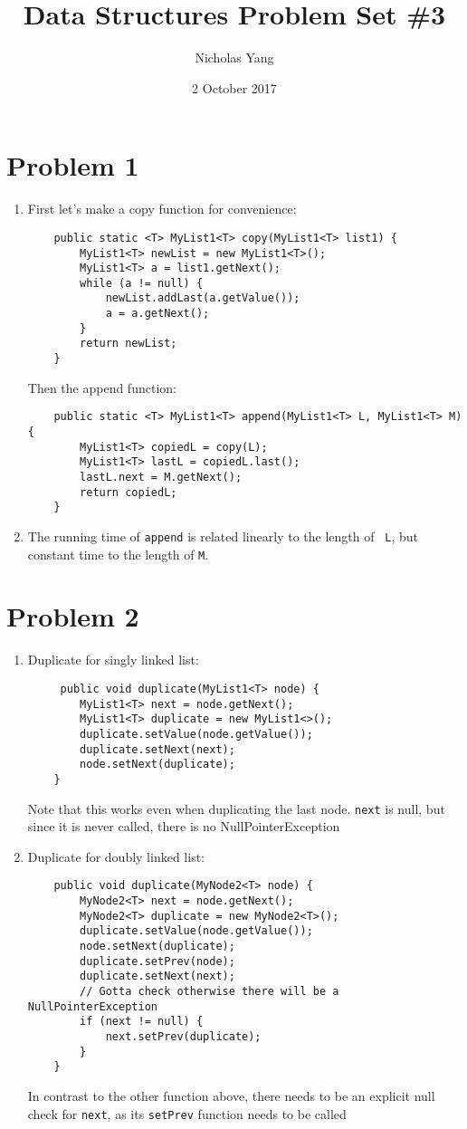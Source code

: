 \documentclass[12pt]{article}
\title{Data Structures Problem Set \#3}
\author{Nicholas Yang}
\date{2 October 2017}
\begin{document}
\maketitle
\section{Problem 1}
\begin{enumerate}[label=(\alph*)]
\item
  First let's make a copy function for convenience:
  \begin{verbatim}
    public static <T> MyList1<T> copy(MyList1<T> list1) {
        MyList1<T> newList = new MyList1<T>();
        MyList1<T> a = list1.getNext();
        while (a != null) {
            newList.addLast(a.getValue());
            a = a.getNext();
        }
        return newList;
    }
  \end{verbatim}
  Then the append function:
  \begin{verbatim}
    public static <T> MyList1<T> append(MyList1<T> L, MyList1<T> M) {
        MyList1<T> copiedL = copy(L);
        MyList1<T> lastL = copiedL.last();
        lastL.next = M.getNext();
        return copiedL;
    }
  \end{verbatim}
\item The running time of {\tt append} is related linearly to the length of {\tt
  L}, but constant time to the length of {\tt M}.
\end{enumerate}
\section{Problem 2}
\begin{enumerate}[label=(\alph*)]
\item Duplicate for singly linked list:
  \begin{verbatim}
     public void duplicate(MyList1<T> node) {
        MyList1<T> next = node.getNext();
        MyList1<T> duplicate = new MyList1<>();
        duplicate.setValue(node.getValue());
        duplicate.setNext(next);
        node.setNext(duplicate);
    }
  \end{verbatim}
  Note that this works even when duplicating the last node. {\tt next} is null,
  but since it is never called, there is no NullPointerException
\item Duplicate for doubly linked list:
  \begin{verbatim}
    public void duplicate(MyNode2<T> node) {
        MyNode2<T> next = node.getNext();
        MyNode2<T> duplicate = new MyNode2<T>();
        duplicate.setValue(node.getValue());
        node.setNext(duplicate);
        duplicate.setPrev(node);
        duplicate.setNext(next);
        // Gotta check otherwise there will be a NullPointerException
        if (next != null) {
            next.setPrev(duplicate);
        }
    }
  \end{verbatim}
  In contrast to the other function above, there needs to be an explicit null
  check for {\tt next}, as its {\tt setPrev} function needs to be called
\end{enumerate}
\end{document}
